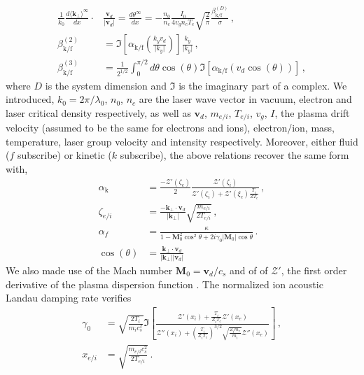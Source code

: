 \documentclass[%
 reprint,
 amsmath,amssymb,
 aps,
]{revtex4-1}
\begin{document}
  \begin{align}
\frac{1}{k_0} \frac{d \langle \mathbf{k}_\perp \rangle^\infty    }{d x} \cdot& \frac{ \mathbf{v}_d }{ \vert \mathbf{v}_d \vert } = \frac{d\theta^\infty}{dx}= - \frac{n_0 }{n_c}  \frac{  I_0 }{ 4 v_g n_c T_e } \sqrt{\frac{2}{\pi}}   \frac{\beta_\mathrm{k/f}^{(D)} }{ \sigma}     
  \, ,\label{eq:bbinf} \\
  \beta_\mathrm{k/f}^{(2)} &=  \Im\left[\alpha_\mathrm{k/f}\left(\frac{k_yv_d}{\vert k_y\vert}\right)\right] \frac{k_y}{\vert k_y\vert}  \, ,\label{eq:beta2} \\
  \beta_\mathrm{k/f}^{(3)} &=\frac{1}{2^{1/2}}\int_{0}^{\pi/2} d\theta \cos(\theta)\Im\left[ \alpha_{\mathrm{k/f}}\left( v_d \cos(\theta) \right)  \right]  \, ,\label{eq:beta3} 
\end{align}
where $D$ is the system dimension and  $\Im$ is the imaginary part of a complex. 
We introduced,  $k_0=2\pi/\lambda_0$, $n_0$, $n_c$ are the laser wave vector in vacuum, electron and laser critical density respectively, as well as  $\mathbf{v}_{d}$, $ m_{e/i}$, $T_{e/i}$, $v_g$, $I$, the plasma drift velocity (assumed to be the same for electrons and ions), electron/ion, mass, temperature, laser group velocity and intensity respectively. 
Moreover, either fluid ($f$ subscribe) or kinetic ($k$ subscribe), the above relations recover the same form with, 
\begin{align}
 \alpha_ \mathrm{k}    & = \frac{-\mathcal{Z}'( \zeta_e) }{2}\frac{\mathcal{Z}'( \zeta_i)   }{  \mathcal{Z}'( \zeta_i) +\mathcal{Z}'( \xi_e)\frac{ T_i }{  ZT_e} } \, ,\label{eq:drakek}
 \\
\zeta_{e/i} &=  \frac{-\mathbf{k}_\perp\cdot\mathbf{v}_{d} }{\vert \mathbf{k}_\perp \vert } \sqrt{ \frac{ m_{e/i} }{ 2T_{e/i} }  }   \label{eq:xi} \, , \\
 \alpha_f  & =\frac{\kappa}{1-\mathbf{M}_0^2\cos^2\theta +2i\gamma_0 \vert\mathbf{M}_0\vert \cos\theta}  \, .  \label{eq:drakeh} \\
 \cos(\theta)& = \frac{\mathbf{k}_\perp\cdot\mathbf{v}_{d} }{\vert \mathbf{k}_\perp \vert \vert \mathbf{v}_{d}\vert  } 
\end{align}
We also made use of the Mach number $\mathbf{M}_0= \mathbf{v}_d/c_s$ and of of $\mathcal{Z}'$, the first order derivative of the plasma dispersion function \cite{Fried_Gell-Mann_1960}.
 The normalized ion acoustic Landau damping rate verifies 
  \begin{align}
\gamma_0 &= \sqrt{\frac{2T_i }{m_ic_s^2 }} 
\Im\left[
\frac{  \mathcal{Z}'\left(x_i\right) 
+\frac{T_i}{Z_iT_e}  \mathcal{Z}'\left(x_e\right)   }{  \mathcal{Z}''\left(x_i\right) +\left(\frac{T_i}{Z_iT_e}\right)^{3/2}\sqrt{\frac{Z_im_e}{m_i}}  \mathcal{Z}''\left(x_e\right)    }
\right]\, , \nonumber \\
x_{e/i}&=\sqrt{\frac{m_{e/i}c_s^2}{2T_{e/i}}}\, .\label{eq:g0}
\end{align}
\end{document}
